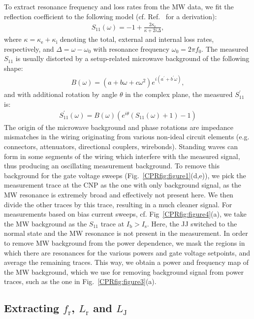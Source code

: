 To extract resonance frequency and loss rates from the MW data, we fit the reflection coefficient to the following model (cf. Ref.~\cite{bosmanBroadbandArchitectureGalvanically2015c} for a derivation):
%
\begin{align}
S_{11}(\omega) = -1+\frac{2\kappa_\text{e}}{\kappa+2i\Delta},
\end{align}
%
where $\kappa=\kappa_\text{e}+\kappa_\text{i}$ denoting the total, external and internal loss rates, respectively, and $\Delta=\omega-\omega_0$ with resonance frequency $\omega_0=2\pi f_0$.
%
The measured $S_{11}$ is usually distorted by a setup-related microwave background of the following shape:
\begin{align}
B(\omega) = \left(a+b\omega+c\omega^2\right)e^{i\left(a^\prime+b^\prime\omega\right)},
\end{align}
%
and with additional rotation by angle $\theta$ in the complex plane, the measured $S_{11}^\prime$ is:
\begin{align}
S_{11}^\prime(\omega)=B(\omega)\left(e^{i\theta}\left(S_{11}(\omega)+1\right)-1\right)
\end{align}
%
The origin of the microwave background and phase rotations are impedance mismatches in the wiring originating from various non-ideal circuit elements (e.g. connectors, attenuators, directional couplers, wirebonds).
%
Standing waves can form in some segments of the wiring which interfere with the measured signal, thus producing an oscillating measurement background.
%
To remove this background for the gate voltage sweeps (Fig.~\ref{CPRfig:figure1}(d,e)), we pick the measurement trace at the CNP as the one with only background signal, as the MW resonance is extremely broad and effectively not present here.
%
We then divide the other traces by this trace, resulting in a much cleaner signal.
%
For measurements based on bias current sweeps, cf. Fig~\ref{CPRfig:figure4}(a), we take the MW background as the $S_{11}$ trace at $I_\text{b}>I_\text{s}$.
%
Here, the JJ switched to the normal state and the MW resonance is not present in the measurement.
%
In order to remove MW background from the power dependence, we mask the regions in which there are resonances for the various powers and gate voltage setpoints, and average the remaining traces.
%
This way, we obtain a power and frequency map of the MW background, which we use for removing background signal from power traces, such as the one in Fig.~\ref{CPRfig:figure3}(a).

\subsection{Extracting $f_\text{r}$, $L_\text{r}$ and $L_\text{J}$}\label{sec:SMcalibration}

